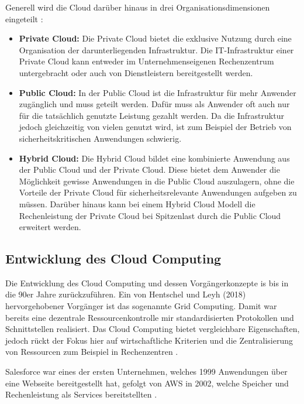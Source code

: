 Generell wird die Cloud darüber hinaus in drei Organisationsdimensionen eingeteilt \cite[Vgl. auch im Folgenden][S. 7ff]{Reinheimer2018}:
\begin{itemize}
\item \textbf{Private Cloud:} Die Private Cloud bietet die exklusive Nutzung durch eine Organisation der darunterliegenden Infrastruktur. Die IT-Infrastruktur einer Private Cloud kann entweder im Unternehmenseigenen Rechenzentrum untergebracht oder auch von Dienstleistern bereitgestellt werden.
\item \textbf{Public Cloud:} In der Public Cloud ist die Infrastruktur für mehr Anwender zugänglich und muss geteilt werden. Dafür muss als Anwender oft auch nur für die tatsächlich genutzte Leistung gezahlt werden. Da die Infrastruktur jedoch gleichzeitig von vielen genutzt wird, ist zum Beispiel der Betrieb von sicherheitskritischen Anwendungen schwierig.
\item \textbf{Hybrid Cloud:} Die Hybrid Cloud bildet eine kombinierte Anwendung aus der Public Cloud und der Private Cloud. Diese bietet dem Anwender die Möglichkeit gewisse Anwendungen in die Public Cloud auszulagern, ohne die Vorteile der Private Cloud für sicherheitsrelevante Anwendungen aufgeben zu müssen. Darüber hinaus kann bei einem Hybrid Cloud Modell die Rechenleistung der Private Cloud bei Spitzenlast durch die Public Cloud erweitert werden. 
\end{itemize}

\pagebreak

\subsection{Entwicklung des Cloud Computing}

Die Entwicklung des Cloud Computing und dessen Vorgängerkonzepte is bis in die 90er Jahre zurückzuführen. Ein von Hentschel und Leyh (2018) hervorgehobener Vorgänger ist das sogenannte Grid Computing. Damit war bereits eine dezentrale Ressourcenkontrolle mir standardisierten Protokollen und Schnittstellen realisiert. Das Cloud Computing bietet vergleichbare Eigenschaften, jedoch rückt der Fokus hier auf wirtschaftliche Kriterien und die Zentralisierung von Ressourcen zum Beispiel in Rechenzentren \cite[Vgl.][S. 5f]{Reinheimer2018}.

Salesforce war eines der ersten Unternehmen, welches 1999 Anwendungen über eine Webseite bereitgestellt hat, gefolgt von \ac{AWS} in 2002, welche Speicher und Rechenleistung als Services bereitstellten \cite[Vgl.][S. 17f]{Srivastava2018}.

